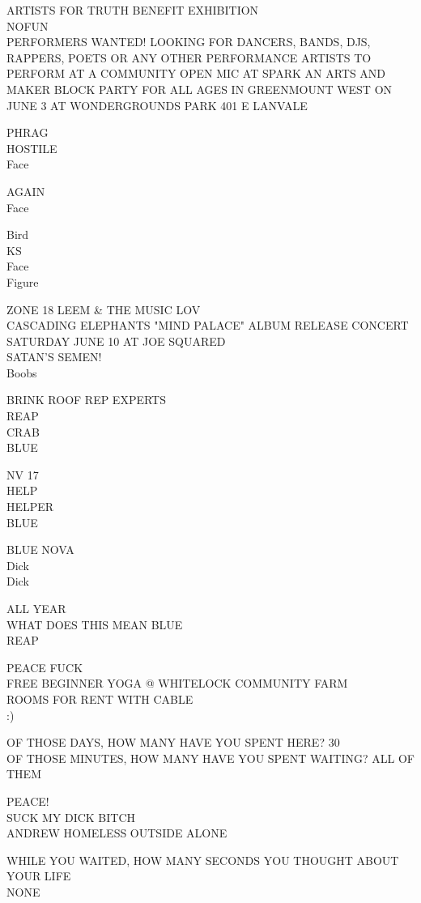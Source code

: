 \documentclass[10pt,letterpaper]{article}
\begin{document}
ARTISTS FOR TRUTH BENEFIT EXHIBITION\\
NOFUN\\
PERFORMERS WANTED!  LOOKING FOR DANCERS, BANDS, DJS, RAPPERS, POETS OR ANY OTHER PERFORMANCE ARTISTS TO PERFORM AT A COMMUNITY OPEN MIC AT SPARK AN ARTS AND MAKER BLOCK PARTY FOR ALL AGES IN GREENMOUNT WEST ON JUNE 3 AT WONDERGROUNDS PARK 401 E LANVALE

PHRAG\\
HOSTILE\\
Face

AGAIN\\
Face

Bird\\
KS\\
Face\\
Figure

ZONE 18 LEEM \& THE MUSIC LOV\\
CASCADING ELEPHANTS "MIND PALACE" ALBUM RELEASE CONCERT SATURDAY JUNE 10 AT JOE SQUARED\\
SATAN'S SEMEN!\\
Boobs

BRINK ROOF REP EXPERTS\\
REAP\\
CRAB\\
BLUE

NV 17\\
HELP\\
HELPER\\
BLUE

BLUE NOVA\\
Dick\\
Dick

ALL YEAR\\
WHAT DOES THIS MEAN BLUE\\
REAP

PEACE FUCK\\
FREE BEGINNER YOGA @ WHITELOCK COMMUNITY FARM\\
ROOMS FOR RENT WITH CABLE\\
:)

OF THOSE DAYS, HOW MANY HAVE YOU SPENT HERE?  30\\
OF THOSE MINUTES, HOW MANY HAVE YOU SPENT WAITING?  ALL OF THEM

PEACE!\\
SUCK MY DICK BITCH\\
ANDREW HOMELESS OUTSIDE ALONE

WHILE YOU WAITED, HOW MANY SECONDS YOU THOUGHT ABOUT YOUR LIFE\\
NONE
\end{document}

